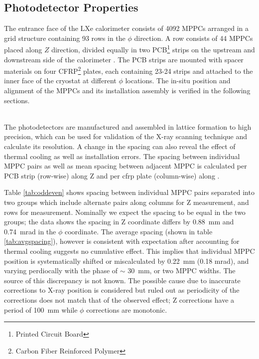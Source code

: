 \subsection{Photodetector Properties} \label{mppcproperties}
The entrance face of the LXe calorimeter consists of 4092 MPPCs
arranged in a grid structure containing 93 rows in the $\phi$ direction.  
A row consists of 44 MPPCs placed along $Z$ direction, divided equally in two
PCB\footnote{Printed Circuit Board} strips on the upstream and
downstream side of the calorimeter \cite{megdesign}.  The PCB strips
are mounted with spacer materials on four CFRP\footnote{Carbon Fiber
Reinforced Polymer} plates, each containing 23-24 strips and attached
to the inner face of the cryostat at different $\phi$ locations.  The
in-situ position and alignment of the MPPCs and its installation
assembly is verified in the following sections.



\\
The photodetectors are manufactured and assembled in lattice formation
to high precision, which can be used for validation of the X-ray
scanning technique and calculate its resolution.  A change in the
spacing can also reveal the effect of thermal cooling as well as
installation errors.  The spacing between individual MPPC pairs as
well as mean spacing between adjacent MPPC is calculated per PCB strip
(row-wise) along Z and per cfrp plate (column-wise) along \phis. 

Table \ref{tab:oddeven} shows spacing between individual MPPC pairs separated
into two groups which include alternate pairs along columns for Z measurement,
and rows for \phis measurement.  Nominally we expect the spacing to be equal in
the two groups; the data shows the spacing in Z coordinate differs by 0.88~mm
and 0.74~mrad in the $\phi$ coordinate.  
The average spacing (shown in table \ref{tab:avgspacing}), however is 
consistent with expectation after accounting
for thermal cooling suggests no cumulative effect. 
This implies that individual MPPC position is systematically
shifted or miscalculated by 0.22~mm (0.18 mrad), and varying 
perdiocally with the phase of $\sim$ 30~mm, or two MPPC widths. 
The source of this discrepancy is not known.
The possible cause due to inaccurate corrections to X-ray position
is considered but ruled out as periodicity of the corrections does not
match that of the observed effect; Z corrections have a period 
of 100~mm while $\phi$ corrections are monotonic.

